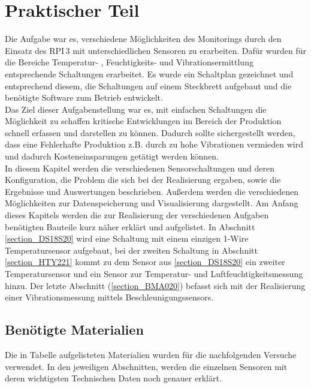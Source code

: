 \chapter{Praktischer Teil}
\label{chapter_Praktischer_Teil}
 Die Aufgabe war es, verschiedene Möglichkeiten des Monitorings durch den Einsatz des \ac{RPI}\,3 mit unterschiedlichen Sensoren zu erarbeiten. Dafür wurden für die Bereiche Temperatur- , Feuchtigkeits- und Vibrationsermittlung entsprechende Schaltungen erarbeitet. Es wurde ein Schaltplan gezeichnet und entsprechend diesem, die Schaltungen auf einem Steckbrett aufgebaut und die benötigte Software zum Betrieb entwickelt.\\
Das Ziel dieser Aufgabenstellung war es, mit einfachen Schaltungen die Möglichkeit zu schaffen kritische Entwicklungen im Bereich der Produktion schnell erfassen und darstellen zu können. Dadurch sollte sichergestellt werden, dass eine Fehlerhafte Produktion z.B. durch zu hohe Vibrationen  vermieden wird und dadurch Kosteneinsparungen getätigt werden können.\\
In diesem Kapitel werden die verschiedenen Sensorschaltungen und deren Konfiguration, die Problem
die sich bei der Realisierung ergaben, sowie die Ergebnisse und Auswertungen beschrieben.
Außerdem werden die verschiedenen Möglichkeiten zur Datenspeicherung und Visualisierung dargestellt. Am Anfang dieses Kapitels werden die zur Realisierung der verschiedenen Aufgaben benötigten Bauteile kurz näher erklärt und aufgelistet. In Abschnitt \ref{section_DS18S20} wird eine Schaltung mit einem einzigen 1-Wire Temperatursensor aufgebaut, bei der zweiten Schaltung in Abschnitt \ref{section_HTY221} kommt zu dem Sensor aus \ref{section_DS18S20} ein zweiter Temperatursensor und ein Sensor zur Temperatur- und Luftfeuchtigkeitsmessung hinzu. Der letzte Abschnitt (\ref{section_BMA020}) befasst sich mit der Realisierung einer Vibrationsmessung mittels Beschleunigungssensors.

\section{Benötigte Materialien}
\label{section_Benötigte_Materialien}
Die in Tabelle aufgelisteten Materialien wurden für die nachfolgenden Versuche verwendet. In den jeweiligen Abschnitten, werden die  einzelnen Sensoren mit deren wichtigsten Technischen Daten noch genauer erklärt. 


